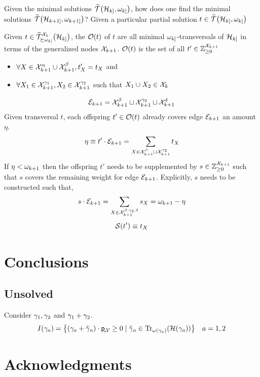 \documentclass[aps, 10pt, english, twoside, twocolumn, pra, nofootinbib, tightenlines, longbibliography, superscriptaddress]{revtex4-1}
\begin{document}
    Given the minimal solutions $\widetilde {\s T}\br{\s H_{k]}, \w_{k]}}$, how does one find the minimal solutions $\widetilde {\s T}\br{\s H_{k+1]}, \w_{k+1]}}$? Given a particular partial solution $t \in \widetilde {\s T}\br{\s H_{k]}, \w_{k]}}$


    \begin{definition}
        Given $t \in \widetilde {\s T}_{\succeq \w_{k]}}^{\s X_{k}}\br{\s H_{k]}}$, the  $\s O\br{t}$ of $t$ are all minimal $\omega_{k]}$-transversals of $\mathcal{H}_{k]}$ in terms of the generalized nodes $\mathcal{X}_{k+1}$. $\s O\br{t}$ is the set of all $t' \in {\mathbb{Z}}_{\geq 0}^{\mathcal{X}_{k+1}}$
        \begin{itemize}
            \item $\forall X \in \mathcal{X}_{k+1}^{\alpha} \cup \mathcal{X}_{k+1}^{\beta}, t'_{X} = t_{X}$ and
            \item $\forall X_1 \in \mathcal{X}_{k+1}^{\gamma_1}, X_2 \in \mathcal{X}_{k+1}^{\gamma_2}$ such that $X_1 \cup X_2 \in \mathcal{X}_{k}$
        \end{itemize}
    \end{definition}
    \[ \mathcal{E}_{k+1} = \mathcal{X}_{k+1}^{\beta} \sqcup \mathcal{X}_{k+1}^{\gamma_2} \sqcup \mathcal{X}_{k+1}^{\delta} \]
    Given transversal $t$, each offspring $t' \in \s O\br{t}$ already covers edge $\mathcal{E}_{k+1}$ an amount $\eta$.
    \[ \eta \equiv t' \cdot \mathcal{E}_{k+1} = \sum_{X \in \mathcal{X}_{k+1}^{\beta} \sqcup \mathcal{X}_{k+1}^{\gamma_2}} t_X \]
    If $\eta < \omega_{k+1}$ then the offspring $t'$ needs to be supplemented by $s \in {\mathbb{Z}}_{\geq 0}^{\mathcal{X}_{k+1}}$ such that $s$ covers the remaining weight for edge $\mathcal{E}_{k+1}$. Explicitly, $s$ needs to be constructed such that,
    \[ s \cdot \mathcal{E}_{k+1} = \sum_{X \in \mathcal{X}_{k+1}^{\beta, \gamma_2, \delta}} s_{X} = \omega_{k+1} - \eta  \]
    \[ \s S\br{t'} \defined  t_X \]


    \section{Conclusions}

    \subsection{Unsolved}
    Consider $\gamma_{1}, \gamma_{2}$ and $\gamma_{1} + \gamma_{2}$.
    \[ I\br{\ga_a} = \bc{\br{\ga_{a} + \ti \ga_{a}} \cdot \prob{\mscenariowrap} \geq 0 \mid \ti \ga_{a} \in \transversals{\w\br{\ga_a}}{\s H\br{\ga_a}}} \quad a = 1,2 \]

    \section*{Acknowledgments}

    \setlength{\bibsep}{3pt plus 3pt minus 2pt}
    
    \nocite{apsrev41Control}
    
\end{document}
